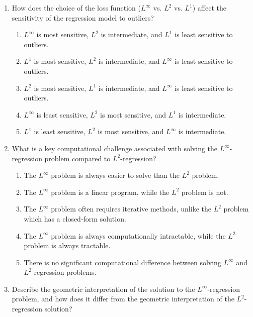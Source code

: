 \documentclass{article}%
\begin{document}
\begin{enumerate}
\begin{enumerate}
\item Minimize the sum of squared errors.%
\item Minimize the average absolute error.%
\item Minimize the median absolute error.%
\end{enumerate}%
\vspace{1em}%
\item How does the choice of the loss function ($L^\infty$ vs. $L^2$ vs. $L^1$) affect the sensitivity of the regression model to outliers?%
\begin{enumerate}%
\item $L^\infty$ is most sensitive, $L^2$ is intermediate, and $L^1$ is least sensitive to outliers.%
\item $L^1$ is most sensitive, $L^2$ is intermediate, and $L^\infty$ is least sensitive to outliers.%
\item $L^2$ is most sensitive, $L^1$ is intermediate, and $L^\infty$ is least sensitive to outliers.%
\item $L^\infty$ is least sensitive, $L^2$ is most sensitive, and $L^1$ is intermediate.%
\item $L^1$ is least sensitive, $L^2$ is most sensitive, and $L^\infty$ is intermediate.%
\end{enumerate}%
\vspace{1em}%
\item What is a key computational challenge associated with solving the $L^\infty$-regression problem compared to $L^2$-regression?%
\begin{enumerate}%
\item The $L^\infty$ problem is always easier to solve than the $L^2$ problem.%
\item The $L^\infty$ problem is a linear program, while the $L^2$ problem is not.%
\item The $L^\infty$ problem often requires iterative methods, unlike the $L^2$ problem which has a closed-form solution.%
\item The $L^\infty$ problem is always computationally intractable, while the $L^2$ problem is always tractable.%
\item There is no significant computational difference between solving $L^\infty$ and $L^2$ regression problems.%
\end{enumerate}%
\vspace{1em}%
\item Describe the geometric interpretation of the solution to the $L^\infty$-regression problem, and how does it differ from the geometric interpretation of the $L^2$-regression solution?%

\end{enumerate}
\end{document}
